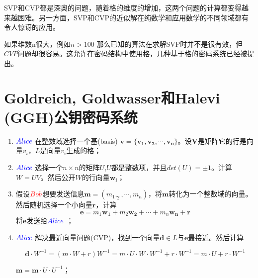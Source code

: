 \documentclass{article}
\theoremstyle{definition}
\begin{document}
SVP和CVP都是深奥的问题，随着格的维度的增加，这两个问题的计算都变得越来越困难。另一方面，SVP和CVP的近似解在纯数学和应用数学的不同领域都有令人惊讶的应用。

如果维数n很大，例如$n > 100 $ 那么已知的算法在求解SVP时并不是很有效，但$CVP$问题却很容易。这允许在密码结构中使用格，几种基于格的密码系统已经被提出。

\section{Goldreich, Goldwasser和Halevi (GGH)公钥密码系统}
\begin{enumerate}
\item ${\color{blue}Alice}$ 在整数域选择一个基(basis) $\mathbf{v = \{v_1,v_2,\cdots,v_n\}}$。设$\mathbf{V}$是矩阵它的行是向量$v_i$，$L$是向量$v_i$生成的格；
\item ${\color{blue}Alice}$ 选择一个$n \times n$的矩阵$U$,$U$都是整数项，并且$det(U) = \pm 1$。计算$W = UV$。然后公开$W$的行向量$\mathbf{w_i}$；
\item 假设${\color{red}Bob}$想要发送信息$\mathbf{m} = (m_1,_2,\cdots,m_n)$，将$\mathbf{m}$转化为一个整数域的向量。然后随机选择一个小向量$\mathbf{r}$，计算$$\mathbf{e} = m_1\mathbf{w_1} +  m_2\mathbf{w_2} + \cdots +  m_n\mathbf{w_n} + \mathbf{r}$$
将$ \mathbf{e}$发送给${\color{blue}Alice}$ ；
\item ${\color{blue}Alice}$ 解决最近向量问题(CVP)，找到一个向量$\mathbf{d} \in L$与$\mathbf{e}$最接近。然后计算

$$
\mathbf{d} \cdot W^{-1}=\left(m \cdot W+r\right) W^{-1}=m \cdot U \cdot W \cdot W^{-1}+r \cdot W^{-1}=m \cdot U+r \cdot W^{-1}
$$

$\mathbf{m} = \mathbf{m} \cdot U \cdot U^{-1}$；
\end{enumerate}

~\\
\end{document}
